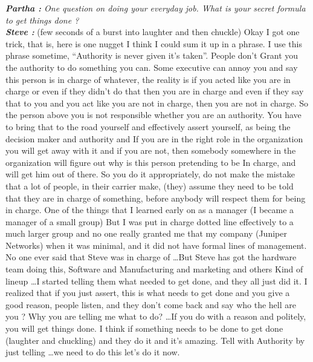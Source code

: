 \documentclass[a4paper, 12pt]{article}
\begin{document}
\begin{flushleft}
        \textit {\textbf {Partha :} One question on doing your everyday job. What is your secret formula to get things done ?} \\
        \textit {\textbf {Steve :}} (few seconds of a burst into laughter and then chuckle) Okay I got one trick, that is, here is one nugget I think I could sum it up in a phrase. I use this phrase sometime, “Authority is never given it’s taken”. People don't  Grant you the authority to do something you can. Some executive can annoy you and say this person is in charge of whatever, the reality is if you acted like you are in charge or even if they didn't do that then you are in charge and even if they say that to you and you act like you are not in charge, then you are not in charge. So the person above you is not responsible whether you are an authority. You have to bring that to the road yourself and effectively assert yourself, as being the decision maker and authority and If you are in the right role in the organization you will get away with it and if you are not, then somebody somewhere in the organization will figure out why is this person pretending to be In charge, and will get him out of there. So you do it appropriately, do not make the mistake that a lot of people, in their carrier make, (they) assume they need to be told that they are in charge of something, before anybody will respect them for being in charge. One of the things that I learned early on as a manager (I became a manager of a small group) But I was put in charge dotted line effectively to a much larger group and no one really granted me that my company (Juniper Networks) when it was minimal, and it did not have formal lines of management. No one ever said that Steve was in charge of \ldots But Steve has got the hardware team doing this, Software and Manufacturing and marketing and others Kind of lineup \ldots I started telling them what needed to get done, and they all just did it. I realized  that if you just  assert, this is what needs to get done and you  give a good reason, people listen, and they don't come back and say who the hell are you ? Why you are telling me what to do? \ldots If you do  with a reason and politely, you will get things done. I think if something needs to be done to get done (laughter and chuckling) and they do it and it's amazing. Tell with Authority by just telling  \ldots we need to do this let's do it now. \\~\\


\end{flushleft}
\end{document}
